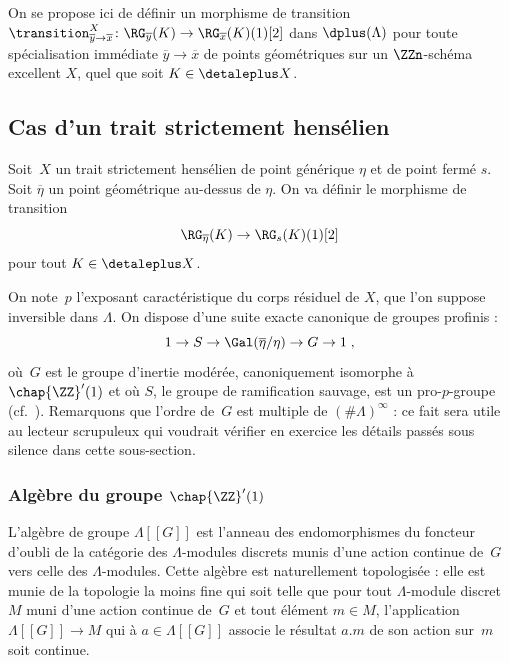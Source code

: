 \documentclass[10pt]{../fichiers-configuration-latex/smfart}
\begin{document}
On se propose ici de définir un morphisme de transition
$\transition^X_{\overline y\to\overline x}\colon
\RG_{\overline y}(K)\to \RG_{\overline
x}(K)(1)[2]$ dans $\dplus(\Lambda)$ pour toute spécialisation immédiate
$\overline y\to \overline x$ de points géométriques sur un $\ZZn$-schéma
excellent $X$, quel que soit $K\in\detaleplus X$.

\subsection{Cas d'un trait strictement hensélien}%

Soit $X$ un trait strictement hensélien de point générique $\eta$ et de
point fermé $s$. 
Soit $\overline \eta$ un point géométrique au-dessus de
$\eta$. On va définir le morphisme de transition
\[\RG_{\overline \eta}(K)\to \RG_s(K)(1)[2]\]
pour tout $K\in\detaleplus X$. 

On note $p$ l'exposant caractéristique du corps résiduel de $X$, que l'on
suppose inversible dans $\Lambda$. On dispose
d'une suite exacte canonique de groupes profinis :
\[1\to S\to \Gal(\overline \eta/\eta)\to G\to 1\;\text{,}\]
où $G$ est le groupe d'inertie modérée, canoniquement isomorphe à
$\chap{\ZZ}'(1)$ et où $S$, le groupe de ramification sauvage, est un
pro-$p$-groupe (cf.~\cite[proposition~6.2.12]{ART@Gabber-Ramero}).
Remarquons que l'ordre de $G$ est multiple de
$(\#\Lambda)^\infty$ : ce fait sera utile au lecteur scrupuleux qui
voudrait vérifier en exercice les détails passés sous silence dans cette
sous-section.

\subsubsection{Algèbre du groupe \texorpdfstring{$\chap{\ZZ}'(1)$}{Z'(1)}}%

\begin{definition3}
L'algèbre de groupe $\Lambda[[G]]$ est l'anneau des endomorphismes du
foncteur d'oubli de la catégorie des $\Lambda$-modules discrets munis
d'une action continue de $G$ vers celle des $\Lambda$-modules. Cette
algèbre est naturellement topologisée : elle est munie de la topologie la
moins fine qui soit telle que pour tout $\Lambda$-module discret $M$ muni
d'une action continue de $G$ et tout élément $m\in M$, l'application
$\Lambda[[G]]\to M$ qui à $a\in\Lambda[[G]]$ associe le résultat $a.m$ de
son action sur $m$ soit continue.
\end{definition3}
\end{document}
